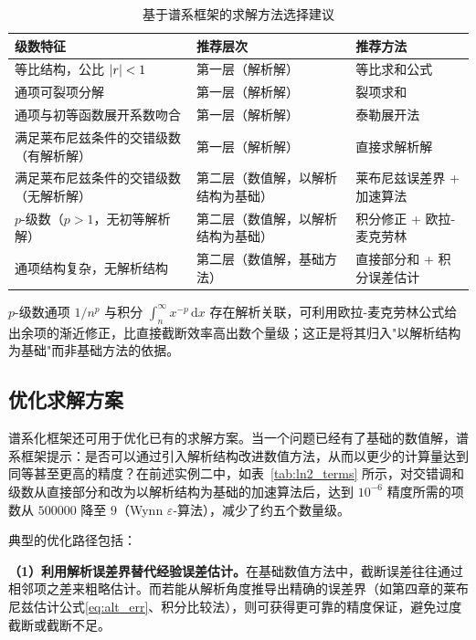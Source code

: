 \begin{table}[htbp]
\centering
\caption{基于谱系框架的求解方法选择建议}
\label{tab:selection}
\begin{threeparttable}
\begin{tabularx}{\textwidth}{lXl}
\toprule
\textbf{级数特征} & \textbf{推荐层次} & \textbf{推荐方法} \\
\midrule
等比结构，公比 $\left|r\right|<1$ & 第一层（解析解） & 等比求和公式 \\
通项可裂项分解 & 第一层（解析解） & 裂项求和 \\
通项与初等函数展开系数吻合 & 第一层（解析解） & 泰勒展开法 \\
满足莱布尼兹条件的交错级数（有解析解） & 第一层（解析解） & 直接求解析解 \\
满足莱布尼兹条件的交错级数（无解析解） & 第二层（数值解，以解析结构为基础） & 莱布尼兹误差界 + 加速算法 \\
$p$-级数（$p>1$，无初等解析解）\tnote{a} & 第二层（数值解，以解析结构为基础） & 积分修正 + 欧拉-麦克劳林 \\
通项结构复杂，无解析结构 & 第二层（数值解，基础方法） & 直接部分和 + 积分误差估计 \\
\bottomrule
\end{tabularx}
\begin{tablenotes}
\footnotesize
\item[a] $p$-级数通项 $1/n^p$ 与积分 $\int_n^\infty x^{-p}\,\mathrm{d}x$ 存在解析关联，可利用欧拉-麦克劳林公式给出余项的渐近修正，比直接截断效率高出数个量级；这正是将其归入"以解析结构为基础"而非基础方法的依据。
\end{tablenotes}
\end{threeparttable}
\end{table}

\subsection{优化求解方案}

谱系化框架还可用于优化已有的求解方案。当一个问题已经有了基础的数值解，谱系框架提示：是否可以通过引入解析结构改进数值方法，从而以更少的计算量达到同等甚至更高的精度？在前述实例二中，如表~\ref{tab:ln2_terms} 所示，对交错调和级数从直接部分和改为以解析结构为基础的加速算法后，达到 $10^{-6}$ 精度所需的项数从 $500000$ 降至 $9$（Wynn $\varepsilon$-算法），减少了约五个数量级。

典型的优化路径包括：

\textbf{（1）利用解析误差界替代经验误差估计。}在基础数值方法中，截断误差往往通过相邻项之差来粗略估计。而若能从解析角度推导出精确的误差界（如第四章的莱布尼兹估计公式\eqref{eq:alt_err}、积分比较法），则可获得更可靠的精度保证，避免过度截断或截断不足。

